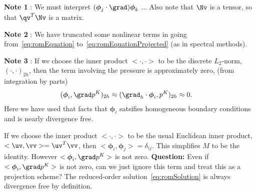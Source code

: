 \documentclass[11pt]{article}
\newcommand{\phiv}{\boldsymbol{\phi}}
\begin{document}
{\bf Note 1} : We must interpret $(\phiv_j\cdot\grad)\phiv_k$ ... Also note that $\Nv$ is a tensor, so that $\qv^T\Nv$ is a matrix. 

{\bf Note 2} : We have truncated some nonlinear terms in going from~\eqref{eq:romEquation} to~\eqref{eq:romEquationProjected} (as
       in spectral methods). 

{\bf Note 3} : If we choose the inner product $<\cdot,\cdot>$ to be the discrete $L_2$-norm, $(\cdot,\cdot)_{2h}$, then
the term involving the pressure is approximately zero, (from integration by parts)
\begin{align}
  ( \phiv_i,\grad p^K )_{2h} & \approx ( \grad_h\cdot\phiv_i,p^K )_{2h} \approx 0.
\end{align}
Here we have used that facts that $\phiv_i$ satsifies homogeneous boundary conditions
and is nearly divergence free. 

If we choose the inner product $<\cdot,\cdot>$ to be the usual Euclidean inner product, $<\uv,\vv>=\uv^T\vv$,
then $<\phiv_i,\phiv_j>=\delta_{ij}$. This simplifies $M$ to be the identity. However $<\phiv_i,\grad p^K >$ is not zero.
{\bf Question:} Even if $<\phiv_i,\grad p^K >$ is not zero, can we just ignore this term and treat this as a projection
   scheme? The reduced-order solution~\eqref{eq:romSolution} is always divergence free by definition.
\end{document}
